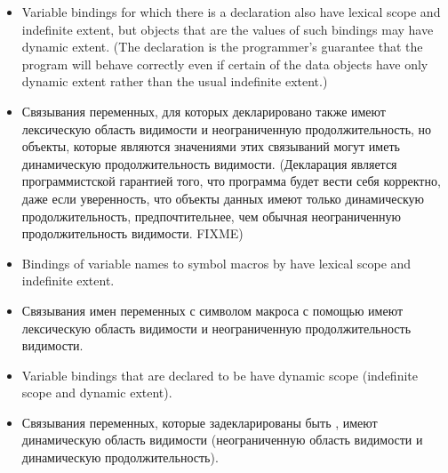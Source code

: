 \begin{newer}
\begin{itemize}
\item Variable bindings for which there is a 
declaration also have lexical scope and indefinite extent,
but objects that are the values of such bindings may have
dynamic extent.
(The declaration is the programmer's guarantee that
the program will behave correctly even if certain of the data objects have only
dynamic extent rather than the usual indefinite extent.)

\item Связывания переменных, для которых декларировано  также
 имеют лексическую область видимости и неограниченную продолжительность, но
 объекты, которые являются значениями этих связываний могут иметь динамическую
 продолжительность видимости.
(Декларация является программистской гарантией того, что программа будет вести
себя корректно, даже если уверенность, что объекты данных имеют только
динамическую продолжительность, предпочтительнее, чем обычная неограниченную
продолжительность видимости. FIXME)

\item Bindings of variable names to symbol macros by
 have lexical scope and indefinite extent.

\item Связывания имен переменных с символом макроса с помощью
   имеют лексическую область видимости и неограниченную
  продолжительность видимости.
\end{itemize}
\end{newer}

\begin{itemize}
\item
Variable bindings that are declared to be  have dynamic scope
(indefinite scope and dynamic extent).

\item 
Связывания переменных, которые задекларированы быть ,
имеют динамическую область видимости (неограниченную область видимости и
динамическую продолжительность).
\end{itemize}

